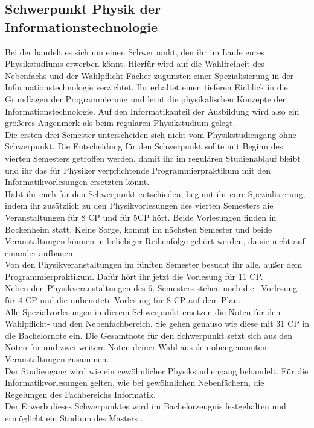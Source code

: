 \subsection{Schwerpunkt Physik der Informationstechnologie}
\label{subsec:studienstruktur_schwerpunkt_it_bsc}
Bei der  handelt es sich um einen Schwerpunkt, den ihr im Laufe eures Physikstudiums erwerben könnt. Hierfür wird auf die Wahlfreiheit des Nebenfachs und der Wahlpflicht-Fächer zugunsten einer Spezialisierung in der Informationstechnologie verzichtet. Ihr erhaltet einen tieferen Einblick in die Grundlagen der Programmierung und lernt die physikalischen Konzepte der Informationstechnologie. Auf den Informatikanteil der Ausbildung wird also ein grö\ss eres Augenmerk als beim regulären Physikstudium gelegt.\\
Die ersten drei Semester unterscheiden sich nicht vom Physikstudiengang ohne Schwerpunkt. Die Entscheidung für den Schwerpunkt sollte mit Beginn des vierten Semesters getroffen werden, damit ihr im regulären Studienablauf bleibt und ihr das für Physiker verpflichtende Programmierpraktikum mit den Informatikvorlesungen ersetzten könnt.\\
Habt ihr euch für den Schwerpunkt entschieden, beginnt ihr eure Spezialisierung, indem ihr zusätzlich zu den Physikvorlesungen des vierten Semesters die Veranstaltungen  für 8 CP und  für 5CP hört. Beide Vorlesungen finden in Bockenheim statt. Keine Sorge,  kommt im nächsten Semester und beide Veranstaltungen können in beliebiger Reihenfolge gehört werden, da sie nicht auf einander aufbauen.\\
Von den Physikveranstaltungen im fünften Semester besucht ihr alle, au\ss er dem Programmierpraktikum. Dafür hört ihr jetzt die Vorlesung  für 11 CP.\\
Neben den Physikveranstaltungen des 6. Semesters stehen noch die --Vorlesung für 4 CP und die unbenotete Vorlesung  für 8 CP auf dem Plan.\\
Alle Spezialvorlesungen in diesem Schwerpunkt ersetzen die Noten für den Wahlpflicht- und den Nebenfachbereich. Sie gehen genauso wie diese mit 31 CP in die Bachelornote ein. Die Gesamtnote f\"ur den Schwerpunkt setzt sich aus den Noten für  und zwei weitere Noten deiner Wahl aus den obengenannten Veranstaltungen zusammen.\\
Der Studiengang wird wie ein gewöhnlicher Physikstudiengang behandelt. Für die Informatikvorlesungen gelten, wie bei gewöhnlichen Nebenfächern, die Regelungen des Fachbereichs Informatik. \\
Der Erwerb dieses Schwerpunktes wird im Bachelorzeugnis festgehalten und ermöglicht ein Studium des Masters .
\newpage
